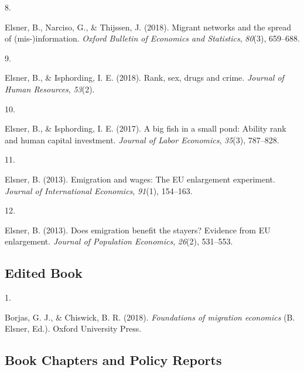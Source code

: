 \documentclass[10pt,a4paper,]{article}
\newlength{\cslhangindent}
\newlength{\csllabelwidth}
\newenvironment{CSLReferences}[2] %
 {\begin{list}{}{%
  \setlength{\itemindent}{0pt}
  \setlength{\leftmargin}{0pt}
  \setlength{\parsep}{0pt}
  \ifodd #1
   \setlength{\leftmargin}{\cslhangindent}
   \setlength{\itemindent}{-1\cslhangindent}
  \fi
  \setlength{\itemsep}{#2\baselineskip}}}
 {\end{list}}
\newcommand{\CSLLeftMargin}[1]{\parbox[t]{\csllabelwidth}{\strut#1\strut}}
\newcommand{\CSLRightInline}[1]{\parbox[t]{\linewidth - \csllabelwidth}{\strut#1\strut}}
\begin{document}
\begin{CSLReferences}{0}{0}
\leavevmode{}%
\CSLLeftMargin{8. }%
\CSLRightInline{Elsner, B., Narciso, G., \& Thijssen, J. (2018). Migrant
networks and the spread of (mis-)information. \emph{Oxford Bulletin of
Economics and Statistics}, \emph{80}(3), 659--688.}

\leavevmode{}%
\CSLLeftMargin{9. }%
\CSLRightInline{Elsner, B., \& Isphording, I. E. (2018). Rank, sex,
drugs and crime. \emph{Journal of Human Resources}, \emph{53}(2).}

\leavevmode{}%
\CSLLeftMargin{10. }%
\CSLRightInline{Elsner, B., \& Isphording, I. E. (2017). A big fish in a
small pond: Ability rank and human capital investment. \emph{Journal of
Labor Economics}, \emph{35}(3), 787--828.}

\leavevmode{}%
\CSLLeftMargin{11. }%
\CSLRightInline{Elsner, B. (2013). Emigration and wages: The EU
enlargement experiment. \emph{Journal of International Economics},
\emph{91}(1), 154--163.}

\leavevmode{}%
\CSLLeftMargin{12. }%
\CSLRightInline{Elsner, B. (2013). Does emigration benefit the stayers?
Evidence from EU enlargement. \emph{Journal of Population Economics},
\emph{26}(2), 531--553.}

\end{CSLReferences}

\hypertarget{edited-book}{%
\subsection{Edited Book}\label{edited-book}}

\hypertarget{refs-8609b63322ef070c16efdaf73080a94d}{}
\begin{CSLReferences}{0}{0}
\leavevmode{}%
\CSLLeftMargin{1. }%
\CSLRightInline{Borjas, G. J., \& Chiswick, B. R. (2018).
\emph{Foundations of migration economics} (B. Elsner, Ed.). Oxford
University Press.}

\end{CSLReferences}

\hypertarget{book-chapters-and-policy-reports}{%
\subsection{Book Chapters and Policy
Reports}\label{book-chapters-and-policy-reports}}
\end{document}
